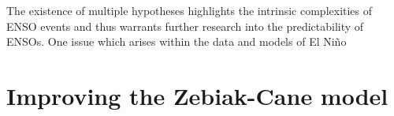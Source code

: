 \documentclass[12pt, onecolumn]{revtex4}    %
\begin{document}


The existence of multiple hypotheses highlights the intrinsic complexities of ENSO events and thus warrants further research into the predictability of ENSOs. One issue which arises within the data and models of El Ni\~{n}o \\

\section{Improving the Zebiak-Cane model}




\newpage



\end{document}
